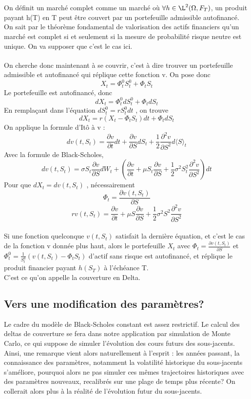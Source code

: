 \documentclass[french,12pt,a4paper]{article}
\begin{document}
 \\ \\
On définit un marché complet comme un marché où  $ \forall h \in \L^2 (\Omega, F_T) $, un produit payant h(T) en T peut être couvert par un portefeuille admissible autofinancé. On sait par le théorème fondamental de valorisation des actifs financiers qu'un marché est complet si et seulement si la mesure de probabilité risque neutre est unique. On va supposer que c'est le cas ici.
\\ \\
On cherche donc maintenant à se couvrir, c'est à dire trouver un portefeuille admissible et autofinancé qui réplique cette fonction v. On pose donc
$$ X_t = \Phi_{t}^0 S_{t}^0  + \Phi_t S_{t}  $$
Le portefeuille est autofinancé, donc
$$ dX_t = \Phi_{t}^0 dS_{t}^0  + \Phi_t dS_{t} $$
En remplaçant dans l'équation $ dS_{t}^0 = r S_{t}^0 dt $ , on trouve
$$ dX_t = r(X_t - \Phi_t S_{t} )dt + \Phi_t dS_{t}  $$
On applique la formule d'Itô à v :
$$ dv(t,S_t) = \frac{\partial v}{\partial t}dt + \frac{\partial v}{\partial S}dS_t + \frac{1}{2} \frac{\partial^2 v}{\partial S^2} d \langle S \rangle_t   $$
Avec la formule de Black-Scholes,
$$ dv(t,S_t) = \sigma S_t \frac{\partial v}{\partial S} dW_t + \left (  \frac{\partial v}{\partial t} + \mu S_t   \frac{\partial v}{\partial S} +  \frac{1}{2} \sigma^2 S_{t}^2 \frac{\partial^2 v}{\partial S^2} \right ) dt	$$
Pour que $ dX_t = dv(t,S_t) $ , nécessairement
$$ \Phi_t = \frac{\partial v(t,S_t)}{\partial S} $$
$$ rv(t,S_t) = \frac{\partial v}{\partial t} + \mu S  \frac{\partial v}{\partial S} +  \frac{1}{2} \sigma^2 S^2 \frac{\partial^2 v}{\partial S^2} $$ \\
Si une fonction quelconque $ v(t,S_t) $ satisfait la dernière équation, et c'est le cas de la fonction v donnée plus haut, alors le portefeuille $ X_t $ avec $ \Phi_t = \frac{\partial v(t,S_t)}{\partial S} $ et $ \Phi_{t}^0  = \frac{1}{S_{t}^0} (v(t,S_t) - \Phi_t S_t )$ d'actif sans risque est autofinancé, et réplique le produit financier payant $ h(S_T) $ à l'échéance T.  \\
C'est ce qu'on appelle la couverture en Delta.

\subsection{Vers une modification des paramètres?}
Le cadre du modèle de Black-Scholes constant est assez restrictif. Le calcul des deltas de couverture se fera dans notre application par simulation de Monte Carlo, ce qui suppose de simuler l’évolution des cours futurs des sous-jacents. Ainsi, une remarque vient alors naturellement à l'esprit : les années passant, la connaissance des paramètres, notamment la volatilité historique du sous-jacents s’améliore, pourquoi alors ne pas simuler ces mêmes trajectoires historiques avec des paramètres nouveaux, recalibrés sur une plage de temps plus récente? On collerait alors plus à la réalité de l'évolution futur du sous-jacents.\\
\end{document}
